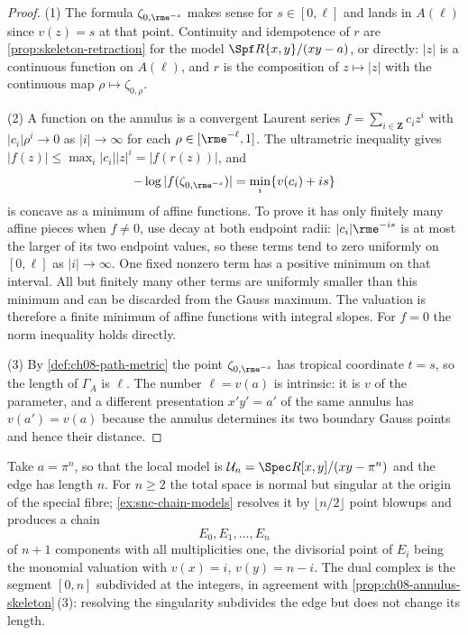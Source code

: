 \begin{proof}
(1)  The formula $\zeta_{0,\rme^{-s}}$ makes sense for $s\in[0,\ell]$ and
lands in $A(\ell)$ since $v(z)=s$ at that point.  Continuity and idempotence
of $r$ are \cref{prop:skeleton-retraction} for the model
$\Spf R\{x,y\}/(xy-a)$, or directly: $|z|$ is a continuous function on
$A(\ell)$, and $r$ is the composition of $z\mapsto|z|$ with the continuous
map $\rho\mapsto\zeta_{0,\rho}$.

(2)  A function on the annulus is a convergent Laurent series
$f=\sum_{i\in\mathbf Z}c_iz^i$ with $|c_i|\rho^i\to0$ as $|i|\to\infty$ for
each $\rho\in[\rme^{-\ell},1]$.  The ultrametric inequality gives
$|f(z)|\leq\max_i|c_i||z|^i=|f(r(z))|$, and
\[
 -\log|f(\zeta_{0,\rme^{-s}})|=\min_i\{v(c_i)+is\}
\]
is concave as a minimum of affine functions.  To prove it has only finitely
many affine pieces when $f\neq0$, use decay at both endpoint radii:
$|c_i|\rme^{-is}$ is at most the larger of its two endpoint values, so
these terms tend to zero uniformly on $[0,\ell]$ as $|i|\to\infty$.
One fixed nonzero term has a positive minimum on that interval.  All but
finitely many other terms are uniformly smaller than this minimum and can
be discarded from the Gauss maximum.  The valuation is therefore a finite
minimum of affine functions with integral slopes.  For $f=0$ the norm
inequality holds directly.

(3)  By \cref{def:ch08-path-metric} the point $\zeta_{0,\rme^{-s}}$ has
tropical coordinate $t=s$, so the length of $\Gamma_A$ is $\ell$.  The
number $\ell=v(a)$ is intrinsic: it is $v$ of the parameter, and a
different presentation $x'y'=a'$ of the same annulus has $v(a')=v(a)$ because
the annulus determines its two boundary Gauss points and hence their
distance.
\end{proof}

\begin{example}
\label{ex:ch08-An-edge}
Take $a=\pi^n$, so that the local model is
$\mathcal U_n=\Spec R[x,y]/(xy-\pi^n)$ and the edge has length $n$.  For $n\geq2$
the total space is normal but singular at the origin of the special fibre;
\cref{ex:snc-chain-models} resolves it by $\lfloor n/2\rfloor$ point blowups
and produces a chain
\[
 E_0,E_1,\ldots,E_n
\]
of $n+1$ components with all multiplicities one, the divisorial point of
$E_i$ being the monomial valuation with $v(x)=i$, $v(y)=n-i$.  The dual
complex is the segment $[0,n]$ subdivided at the integers, in agreement with
\cref{prop:ch08-annulus-skeleton}\,(3): resolving the singularity subdivides
the edge but does not change its length.
\end{example}

